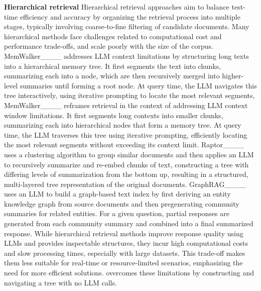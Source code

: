 \noindent\textbf{Hierarchical retrieval}
Hierarchical retrieval approaches aim to balance test-time efficiency and accuracy by organizing the retrieval process into multiple stages, typically involving coarse-to-fine filtering of candidate documents.
Many hierarchical methods face challenges related to computational cost and performance trade-offs, and scale poorly with the size of the corpus.
MemWalker____ addresses LLM context limitations by structuring long texts into a hierarchical memory tree. It first segments the text into chunks, summarizing each into a node, which are then recursively merged into higher-level summaries until forming a root node. At query time, the LLM navigates this tree interactively, using iterative prompting to locate the most relevant segments, 
%
MemWalker____ reframes retrieval in the context of addressing LLM context window limitations. It first segments long contexts into smaller chunks, summarizing each into hierarchical nodes that form a memory tree. At query time, the LLM traverses this tree using iterative prompting, efficiently locating the most relevant segments without exceeding its context limit.
Raptor____ uses a clustering algorithm to group similar documents and then applies an LLM to recursively summarize and re-embed chunks of text, constructing a tree with differing levels of summarization from the bottom up, resulting in a structured, multi-layered tree representation of the original documents. 
GraphRAG____ uses an LLM to build a graph-based text index by first deriving an entity knowledge graph from source documents and then pregenerating community summaries for related entities. For a given question, partial responses are generated from each community summary and combined into a final summarized response.
%
While hierarchical retrieval methods improve response quality using LLMs and provides inspectable structures, they incur high computational costs and slow processing times, especially with large datasets. This trade-off makes them less suitable for real-time or resource-limited scenarios, emphasizing the need for more efficient solutions.
\ourmodel{} overcomes these limitations by constructing and navigating a tree with no LLM calls. 

